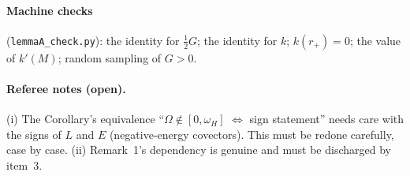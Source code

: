 \documentclass[11pt]{article}
\theoremstyle{remark}\newtheorem{remark}{Remark}
\begin{document}
\paragraph{Machine checks} (\texttt{lemmaA\_check.py}): the identity for $\tfrac12G$; the identity for $k$; $k(r_+)=0$; the value of $k'(M)$; random sampling of $G>0$.

\paragraph{Referee notes (open).}
(i) The Corollary's equivalence ``$\Omega\notin[0,\omega_H]$ $\Leftrightarrow$ sign statement'' needs care with the signs of $L$ and $E$ (negative-energy covectors). This must be redone carefully, case by case.
(ii) Remark~1's dependency is genuine and must be discharged by item~3.
\end{document}
